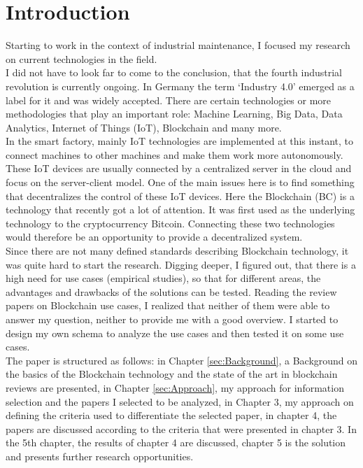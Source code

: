 \section{Introduction}
\begin{comment}
What I could also mention:
\cite{2018_Brandao} mentions that they concluded in their study, that there is a growing importance of certain areas in the blockchain research. One of these areas is smart cities and business which impacts our team, smart industry ! The term smart places includes the term smart industry because the industry is nothing but another place to use IoT/ Blockchain smart factory / smart manufacturing
\end{comment}
Starting to work in the context of industrial maintenance, I focused my research on current technologies in the field.\\
I did not have to look far to come to the conclusion, that the fourth industrial revolution is currently ongoing. In Germany the term ‘Industry 4.0’ emerged as a label for it and was widely accepted. There are certain technologies or more methodologies that play an important role: Machine Learning, Big Data, Data Analytics, Internet of Things (IoT), Blockchain and many more. \\
In the smart factory, mainly IoT technologies are implemented at this instant, to connect machines to other machines and make them work more autonomously. These IoT devices are usually connected by a centralized server in the cloud and focus on the server-client model. One of the main issues here is to find something that decentralizes the control of these IoT devices. Here the Blockchain (BC) is a technology that recently got a lot of attention. It was first used as the underlying technology to the cryptocurrency Bitcoin. Connecting these two technologies would therefore be an opportunity to provide a decentralized system. \\
Since there are not many defined standards describing Blockchain technology, it was quite hard to start the research. Digging deeper, I figured out, that there is a high need for use cases (empirical studies), so that for different areas, the advantages and drawbacks of the solutions can be tested. Reading the review papers on Blockchain use cases, I realized that neither of them were able to answer my question, neither to provide me with a good overview. I started to design my own schema to analyze the use cases and then tested it on some use cases.\\
The paper is structured as follows: in Chapter \ref{sec:Background}, a Background on the basics of the Blockchain technology and the state of the art in blockchain reviews are presented, in Chapter \ref{sec:Approach}, my approach for information selection and the papers I selected to be analyzed, in Chapter 3, my approach on defining the criteria used to differentiate the selected paper, in chapter 4, the papers are discussed according to the criteria that were presented in chapter 3. In the 5th chapter, the results of chapter 4 are discussed, chapter 5 is the solution and presents further research opportunities.
